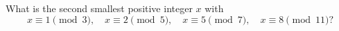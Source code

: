 What is the second smallest positive integer $x$ with
\[x\equiv1\pmod3,\quad x\equiv2\pmod5,\quad x\equiv5\pmod7,\quad x\equiv8\pmod{11}?\]
